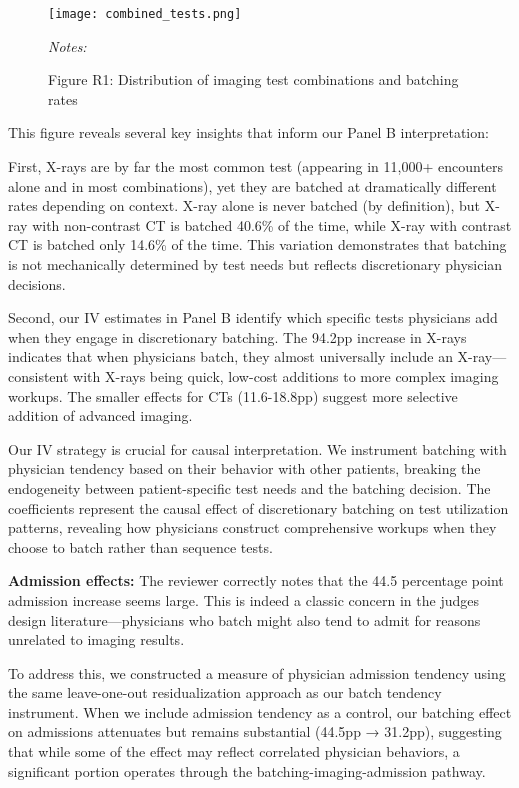 \documentclass[11pt]{article}
\newcommand{\1}{\hbox{\rm 1\kern-.35em 1}}
\begin{document}
{\begin{figure}[ht]
\centering
\begin{threeparttable}
\caption*{Figure R1: Distribution of imaging test combinations and batching rates}
\texttt{[image: combined\_tests.png]}
    \label{fig:consort}
    \begin{tablenotes}
        \small
        \item \textit{Notes:} 
    \end{tablenotes}
\end{threeparttable}
\end{figure}


This figure reveals several key insights that inform our Panel B interpretation:

First, X-rays are by far the most common test (appearing in 11,000+ encounters alone and in most combinations), yet they are batched at dramatically different rates depending on context. X-ray alone is never batched (by definition), but X-ray with non-contrast CT is batched 40.6\% of the time, while X-ray with contrast CT is batched only 14.6\% of the time. This variation demonstrates that batching is not mechanically determined by test needs but reflects discretionary physician decisions.

Second, our IV estimates in Panel B identify which specific tests physicians add when they engage in discretionary batching. The 94.2pp increase in X-rays indicates that when physicians batch, they almost universally include an X-ray—consistent with X-rays being quick, low-cost additions to more complex imaging workups. The smaller effects for CTs (11.6-18.8pp) suggest more selective addition of advanced imaging.

Our IV strategy is crucial for causal interpretation. We instrument batching with physician tendency based on their behavior with other patients, breaking the endogeneity between patient-specific test needs and the batching decision. The coefficients represent the causal effect of discretionary batching on test utilization patterns, revealing how physicians construct comprehensive workups when they choose to batch rather than sequence tests.


\textbf{Admission effects:}
The reviewer correctly notes that the 44.5 percentage point admission increase seems large. This is indeed a classic concern in the judges design literature—physicians who batch might also tend to admit for reasons unrelated to imaging results.

To address this, we constructed a measure of physician admission tendency using the same leave-one-out residualization approach as our batch tendency instrument. When we include admission tendency as a control, our batching effect on admissions attenuates but remains substantial (44.5pp → 31.2pp), suggesting that while some of the effect may reflect correlated physician behaviors, a significant portion operates through the batching-imaging-admission pathway.

}
\end{document}

